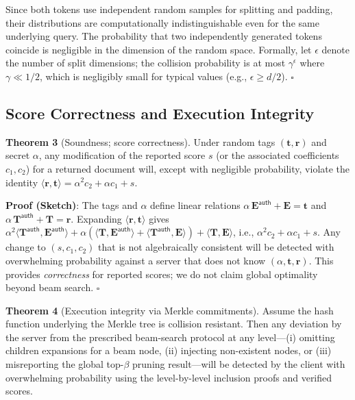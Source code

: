 \documentclass[journal]{IEEEtran}
\begin{document}
Since both tokens use independent random samples for splitting and padding, their distributions are computationally indistinguishable even for the same underlying query. The probability that two independently generated tokens coincide is negligible in the dimension of the random space. Formally, let $\epsilon$ denote the number of split dimensions; the collision probability is at most $\gamma^\epsilon$ where $\gamma \ll 1/2$, which is negligibly small for typical values (e.g., $\epsilon \geq d/2$). \hfill $\square$

\subsection{Score Correctness and Execution Integrity}

\textbf{Theorem 3} (Soundness; score correctness).\label{thm:soundness} Under random tags $(\mathbf{t},\mathbf{r})$ and secret $\alpha$, any modification of the reported score $s$ (or the associated coefficients $c_1,c_2$) for a returned document will, except with negligible probability, violate the identity $\langle \mathbf{r}, \mathbf{t}\rangle = \alpha^2 c_2 + \alpha c_1 + s$.

\textbf{Proof (Sketch)}: The tags and $\alpha$ define linear relations $\alpha\,\mathbf{E}^{\mathsf{auth}}+\mathbf{E}=\mathbf{t}$ and $\alpha\,\mathbf{T}^{\mathsf{auth}}+\mathbf{T}=\mathbf{r}$. Expanding $\langle \mathbf{r}, \mathbf{t}\rangle$ gives $\alpha^2\langle \mathbf{T}^{\mathsf{auth}},\mathbf{E}^{\mathsf{auth}}\rangle + \alpha(\langle \mathbf{T},\mathbf{E}^{\mathsf{auth}}\rangle + \langle \mathbf{T}^{\mathsf{auth}},\mathbf{E}\rangle) + \langle \mathbf{T},\mathbf{E}\rangle$, i.e., $\alpha^2 c_2 + \alpha c_1 + s$. Any change to $(s,c_1,c_2)$ that is not algebraically consistent will be detected with overwhelming probability against a server that does not know $(\alpha,\mathbf{t},\mathbf{r})$. This provides \emph{correctness} for reported scores; we do not claim global optimality beyond beam search. \hfill $\square$

\textbf{Theorem 4} (Execution integrity via Merkle commitments). Assume the hash function underlying the Merkle tree is collision resistant. Then any deviation by the server from the prescribed beam-search protocol at any level—(i) omitting children expansions for a beam node, (ii) injecting non-existent nodes, or (iii) misreporting the global top-$\beta$ pruning result—will be detected by the client with overwhelming probability using the level-by-level inclusion proofs and verified scores.
\end{document}
